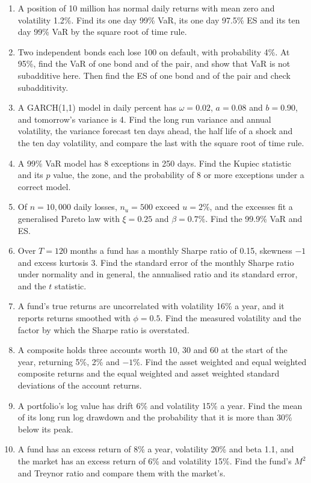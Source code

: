\begin{chapterrefs}
\begin{enumerate}[label=\textbf{8.\arabic*}, leftmargin=*, ref=8.\arabic*]
  \item\label{exr8:one} A position of 10 million has normal daily returns with mean zero and
  volatility 1.2\%. Find its one day 99\% VaR, its one day 97.5\% ES and its ten day 99\% VaR by the
  square root of time rule.
  \item\label{exr8:two} Two independent bonds each lose 100 on default, with probability 4\%. At
  95\%, find the VaR of one bond and of the pair, and show that VaR is not subadditive here. Then find
  the ES of one bond and of the pair and check subadditivity.
  \item\label{exr8:three} A GARCH(1,1) model in daily percent has $\omega=0.02$, $a=0.08$ and $b=0.90$,
  and tomorrow's variance is 4. Find the long run variance and annual volatility, the variance forecast
  ten days ahead, the half life of a shock and the ten day volatility, and compare the last with the
  square root of time rule.
  \item\label{exr8:four} A 99\% VaR model has 8 exceptions in 250 days. Find the Kupiec statistic and
  its $p$ value, the zone, and the probability of 8 or more exceptions under a correct model.
  \item\label{exr8:five} Of $n=10{,}000$ daily losses, $n_u=500$ exceed $u=2\%$, and the excesses fit
  a generalised Pareto law with $\xi=0.25$ and $\beta=0.7\%$. Find the 99.9\% VaR and ES.
  \item\label{exr8:six} Over $T=120$ months a fund has a monthly Sharpe ratio of 0.15, skewness $-1$ and
  excess kurtosis 3. Find the standard error of the monthly Sharpe ratio under normality and in
  general, the annualised ratio and its standard error, and the $t$ statistic.
  \item\label{exr8:seven} A fund's true returns are uncorrelated with volatility 16\% a year, and it
  reports returns smoothed with $\phi=0.5$. Find the measured volatility and the factor by which the
  Sharpe ratio is overstated.
  \item\label{exr8:eight} A composite holds three accounts worth 10, 30 and 60 at the start of the year,
  returning 5\%, 2\% and $-1\%$. Find the asset weighted and equal weighted composite returns and the
  equal weighted and asset weighted standard deviations of the account returns.
  \item\label{exr8:nine} A portfolio's log value has drift 6\% and volatility 15\% a year. Find the mean
  of its long run log drawdown and the probability that it is more than 30\% below its peak.
  \item\label{exr8:ten} A fund has an excess return of 8\% a year, volatility 20\% and beta 1.1, and the
  market has an excess return of 6\% and volatility 15\%. Find the fund's $M^2$ and Treynor ratio and
  compare them with the market's.
\end{enumerate}


\end{chapterrefs}
